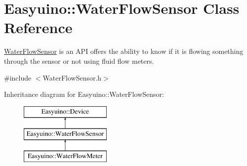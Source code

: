 \hypertarget{class_easyuino_1_1_water_flow_sensor}{}\section{Easyuino\+:\+:Water\+Flow\+Sensor Class Reference}
\label{class_easyuino_1_1_water_flow_sensor}


\hyperlink{class_easyuino_1_1_water_flow_sensor}{Water\+Flow\+Sensor} is an A\+PI offers the ability to know if it is flowing something through the sensor or not using fluid flow meters.  




{\ttfamily \#include $<$Water\+Flow\+Sensor.\+h$>$}

Inheritance diagram for Easyuino\+:\+:Water\+Flow\+Sensor\+:\begin{figure}[H]
\begin{center}
\leavevmode
\includegraphics[height=3.000000cm]{class_easyuino_1_1_water_flow_sensor}
\end{center}
\end{figure}
